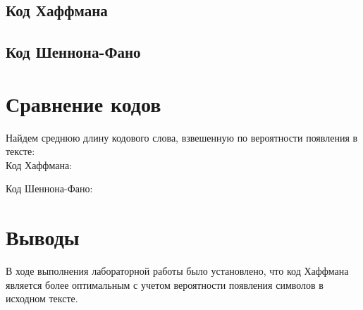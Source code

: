 \documentclass[listings]{labreport}
\begin{document}
\subsection*{Код Хаффмана}

\noindent
{}

\subsection*{Код Шеннона-Фано}

\noindent
{}

\section*{Сравнение кодов}

Найдем среднюю длину кодового слова, взвешенную по вероятности появления в тексте:\\

Код Хаффмана:


Код Шеннона-Фано:


\section*{Выводы}

В ходе выполнения лабораторной работы было установлено, что код Хаффмана
является более оптимальным с учетом вероятности появления символов в исходном тексте.
\end{document}

